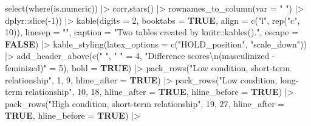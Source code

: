 \documentclass[
  bookmarksnumbered]{article}
\newenvironment{Shaded}{\begin{snugshade}}{\end{snugshade}}
\newcommand{\AttributeTok}[1]{\textcolor[rgb]{0.80,0.80,0.80}{#1}}
\newcommand{\ConstantTok}[1]{\textcolor[rgb]{0.86,0.64,0.64}{\textbf{#1}}}
\newcommand{\DecValTok}[1]{\textcolor[rgb]{0.86,0.86,0.80}{#1}}
\newcommand{\FunctionTok}[1]{\textcolor[rgb]{0.94,0.94,0.56}{#1}}
\newcommand{\NormalTok}[1]{\textcolor[rgb]{0.80,0.80,0.80}{#1}}
\newcommand{\OtherTok}[1]{\textcolor[rgb]{0.94,0.94,0.56}{#1}}
\newcommand{\SpecialCharTok}[1]{\textcolor[rgb]{0.86,0.64,0.64}{#1}}
\newcommand{\StringTok}[1]{\textcolor[rgb]{0.80,0.58,0.58}{#1}}
\begin{document}
\begin{Shaded}
\begin{Highlighting}[]
              \FunctionTok{select}\NormalTok{(}\FunctionTok{where}\NormalTok{(is.numeric)) }\SpecialCharTok{|\textgreater{}} 
              \FunctionTok{corr.stars}\NormalTok{() }\SpecialCharTok{|\textgreater{}}
              \FunctionTok{rownames\_to\_column}\NormalTok{(}\AttributeTok{var =} \StringTok{" "}\NormalTok{) }\SpecialCharTok{|\textgreater{}} 
\NormalTok{              dplyr}\SpecialCharTok{::}\FunctionTok{slice}\NormalTok{(}\SpecialCharTok{{-}}\DecValTok{1}\NormalTok{)) }\SpecialCharTok{|\textgreater{}} 
  \FunctionTok{kable}\NormalTok{(}\AttributeTok{digits =} \DecValTok{2}\NormalTok{,}
        \AttributeTok{booktabs =} \ConstantTok{TRUE}\NormalTok{,}
        \AttributeTok{align =} \FunctionTok{c}\NormalTok{(}\StringTok{"l"}\NormalTok{, }\FunctionTok{rep}\NormalTok{(}\StringTok{"c"}\NormalTok{, }\DecValTok{10}\NormalTok{)),}
        \AttributeTok{linesep =} \StringTok{""}\NormalTok{,}
        \AttributeTok{caption =} \StringTok{"Two tables created by knitr::kables()."}\NormalTok{,}
        \AttributeTok{escape =} \ConstantTok{FALSE}\NormalTok{) }\SpecialCharTok{|\textgreater{}}
  \FunctionTok{kable\_styling}\NormalTok{(}\AttributeTok{latex\_options =} \FunctionTok{c}\NormalTok{(}\StringTok{"HOLD\_position"}\NormalTok{, }\StringTok{"scale\_down"}\NormalTok{)) }\SpecialCharTok{|\textgreater{}}
  \FunctionTok{add\_header\_above}\NormalTok{(}\FunctionTok{c}\NormalTok{(}\StringTok{" "}\NormalTok{,}
                     \StringTok{" "} \OtherTok{=} \DecValTok{4}\NormalTok{, }
                     \StringTok{"Difference scores}\SpecialCharTok{\textbackslash{}n}\StringTok{(masculinized {-} feminized)"} \OtherTok{=} \DecValTok{5}\NormalTok{),}
                   \AttributeTok{bold =} \ConstantTok{TRUE}\NormalTok{) }\SpecialCharTok{|\textgreater{}}
  \FunctionTok{pack\_rows}\NormalTok{(}\StringTok{"Low condition, short{-}term relationship"}\NormalTok{, }\DecValTok{1}\NormalTok{, }\DecValTok{9}\NormalTok{,}
            \AttributeTok{hline\_after =} \ConstantTok{TRUE}\NormalTok{) }\SpecialCharTok{|\textgreater{}} 
  \FunctionTok{pack\_rows}\NormalTok{(}\StringTok{"Low condition, long{-}term relationship"}\NormalTok{, }\DecValTok{10}\NormalTok{, }\DecValTok{18}\NormalTok{,}
            \AttributeTok{hline\_after =} \ConstantTok{TRUE}\NormalTok{, }\AttributeTok{hline\_before =} \ConstantTok{TRUE}\NormalTok{) }\SpecialCharTok{|\textgreater{}}
  \FunctionTok{pack\_rows}\NormalTok{(}\StringTok{"High condition, short{-}term relationship"}\NormalTok{, }\DecValTok{19}\NormalTok{, }\DecValTok{27}\NormalTok{,}
            \AttributeTok{hline\_after =} \ConstantTok{TRUE}\NormalTok{, }\AttributeTok{hline\_before =} \ConstantTok{TRUE}\NormalTok{) }\SpecialCharTok{|\textgreater{}} 

\end{Highlighting}
\end{Shaded}
\end{document}
